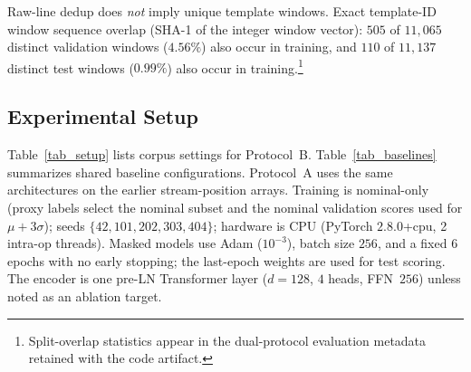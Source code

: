 \documentclass[a4paper]{llncs}
\renewcommand{\arraystretch}{0.95}
\begin{document}
Raw-line dedup does \emph{not} imply unique template windows. Exact template-ID window sequence overlap (SHA-1 of the integer window vector): $505$ of $11{,}065$ distinct validation windows ($4.56\%$) also occur in training, and $110$ of $11{,}137$ distinct test windows ($0.99\%$) also occur in training.\footnote{Split-overlap statistics appear in the dual-protocol evaluation metadata retained with the code artifact.}

\subsection{Experimental Setup}
Table~\ref{tab_setup} lists corpus settings for Protocol~B. Table~\ref{tab_baselines} summarizes shared baseline configurations. Protocol~A uses the same architectures on the earlier stream-position arrays. Training is nominal-only (proxy labels select the nominal subset and the nominal validation scores used for $\mu{+}3\sigma$); seeds $\{42,101,202,303,404\}$; hardware is CPU (PyTorch $2.8.0$+cpu, 2 intra-op threads). Masked models use Adam ($10^{-3}$), batch size $256$, and a fixed $6$ epochs with no early stopping; the last-epoch weights are used for test scoring. The encoder is one pre-LN Transformer layer ($d{=}128$, $4$ heads, FFN~$256$) unless noted as an ablation target.

\begin{table}[htbp]
\caption{Protocol~B corpus setup. Window label $=$ OR over $L$ proxy line labels.}
\label{tab_setup}
\centering
\setlength{\tabcolsep}{3pt}
\renewcommand{\arraystretch}{0.88}
\end{table}
\end{document}
